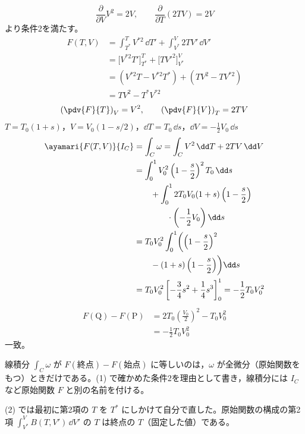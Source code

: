 \[ \frac{\partial}{\partial V}V^{2}=2V, \qquad \frac{\partial}{\partial T}(2TV)=2V \]
より条件2を満たす。
\begin{align*}
F(T,V)&=\int_{T^{*}}^{T}V^{*2}\,\dd T'+\int_{V^{*}}^{V}2TV'\,\dd V'\\
&=\bigl[V^{*2}T'\bigr]_{T^{*}}^{T}+\bigl[TV'^{2}\bigr]_{V^{*}}^{V}\\
&=(V^{*2}T-V^{*2}T^{*})+(TV^{2}-TV^{*2})\\
&=TV^{2}-T^{*}V^{*2}
\end{align*}
\[ \left(\pdv{F}{T}\right)_{V}=V^{2}, \qquad \left(\pdv{F}{V}\right)_{T}=2TV \]
$T=T_{0}(1+s)$，$V=V_{0}(1-s/2)$，$\dd T=T_{0}\,\dd s$，$\dd V=-\frac{1}{2}V_{0}\,\dd s$
\begin{align*}
\ayamari{F(T,V)}{I_{C}}&=\int_{C}\omega=\int_{C}V^{2}\,\dd T+2TV\,\dd V\\
&=\int_{0}^{1}V_{0}^{2}\left(1-\frac{s}{2}\right)^{2}T_{0}\,\dd s\\
&\qquad+\int_{0}^{1}2T_{0}V_{0}(1+s)\left(1-\frac{s}{2}\right)\\
&\qquad\qquad\cdot\left(-\frac{1}{2}V_{0}\right)\dd s\\
&=T_{0}V_{0}^{2}\int_{0}^{1}\biggl(\left(1-\frac{s}{2}\right)^{2}\\
&\qquad-(1+s)\left(1-\frac{s}{2}\right)\biggr)\dd s\\
&=T_{0}V_{0}^{2}\left[-\frac{3}{4}s^{2}+\frac{1}{4}s^{3}\right]_{0}^{1}=-\frac{1}{2}T_{0}V_{0}^{2}
\end{align*}
\begin{align*}
F(\mathrm{Q})-F(\mathrm{P})&=2T_{0}\left(\frac{V_{0}}{2}\right)^{2}-T_{0}V_{0}^{2}\\
&=-\frac{1}{2}T_{0}V_{0}^{2}
\end{align*}
一致。
\item 線積分 $\int_{C}\omega$ が $F(\text{終点})-F(\text{始点})$ に等しいのは，$\omega$ が全微分（原始関数をもつ）ときだけである。(1) で確かめた条件2を理由として書き，線積分には $I_{C}$ など原始関数 $F$ と別の名前を付ける。
\item (2) では最初に第2項の $T$ を $T^{*}$ にしかけて自分で直した。原始関数の構成の第2項 $\int_{V^{*}}^{V}B(T,V')\,\dd V'$ の $T$ は終点の $T$（固定した値）である。
